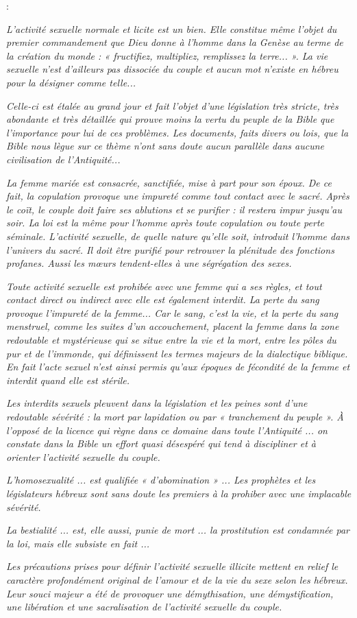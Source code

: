 : {\emph{L'activité sexuelle normale et licite est un bien. Elle constitue même l'objet du premier commandement que Dieu donne à l'homme dans la Genèse au terme de la création du monde : « fructifiez, multipliez, remplissez la terre... ». La vie sexuelle n'est d'ailleurs pas dissociée du couple et aucun mot n'existe en hébreu pour la désigner comme telle...}

 \emph{Celle-ci est étalée au grand jour et fait l'objet d'une législation très stricte, très abondante et très détaillée qui prouve moins la vertu du peuple de la Bible que l'importance pour lui de ces problèmes. Les documents, faits divers ou lois, que la Bible nous lègue sur ce thème n'ont sans doute aucun parallèle dans aucune civilisation de l'Antiquité...}

 \emph{La femme mariée est consacrée, sanctifiée, mise à part pour son époux. De ce fait, la copulation provoque une impureté comme tout contact avec le sacré. Après le coït, le couple doit faire ses ablutions et se purifier : il restera impur jusqu'au soir. La loi est la même pour l'homme après toute copulation ou toute perte séminale. L'activité sexuelle, de quelle nature qu'elle soit, introduit l'homme dans l'univers du sacré. Il doit être purifié pour retrouver la plénitude des fonctions profanes. Aussi les mœurs tendent-elles à une ségrégation des sexes.}

 \emph{Toute activité sexuelle est prohibée avec une femme qui a ses règles, et tout contact direct ou indirect avec elle est également interdit. La perte du sang provoque l'impureté de la femme... Car le sang, c'est la vie, et la perte du sang menstruel, comme les suites d'un accouchement, placent la femme dans la zone redoutable et mystérieuse qui se situe entre la vie et la mort, entre les pôles du pur et de l'immonde, qui définissent les termes majeurs de la dialectique biblique. En fait l'acte sexuel n'est ainsi permis qu'aux époques de fécondité de la femme et interdit quand elle est stérile.}

 \emph{Les interdits sexuels pleuvent dans la législation et les peines sont d'une redoutable sévérité : la mort par lapidation ou par « tranchement du peuple ». À l'opposé de la licence qui règne dans ce domaine dans toute l'Antiquité ... on constate dans la Bible un effort quasi désespéré qui tend à discipliner et à orienter l'activité sexuelle du couple.}

 \emph{L'homosexualité ... est qualifiée « d'abomination » ... Les prophètes et les législateurs hébreux sont sans doute les premiers à la prohiber avec une implacable sévérité.}

 \emph{La bestialité ... est, elle aussi, punie de mort ... la prostitution est condamnée par la loi, mais elle subsiste en fait ...}

 \emph{Les précautions prises pour définir l'activité sexuelle illicite mettent en relief le caractère profondément original de l'amour et de la vie du sexe selon les hébreux. Leur souci majeur a été de provoquer une démythisation, une démystification, une libération et une sacralisation de l'activité sexuelle du couple.}}


